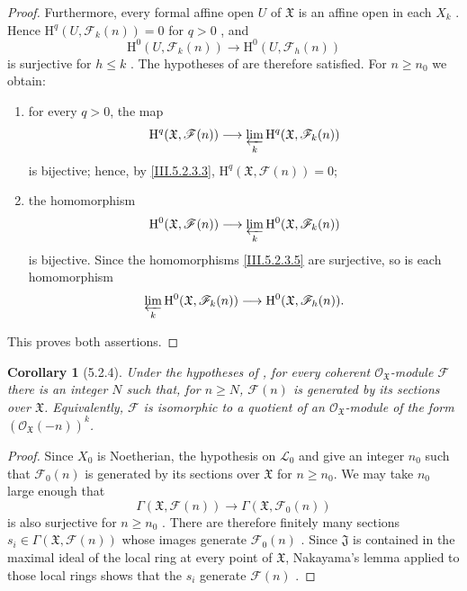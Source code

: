 \documentclass[oneside]{amsart}
\theoremstyle{ega-env-style}
\theoremstyle{ega-thm-env-style}
\newtheorem*{corollary}{Corollary}
\theoremstyle{ega-defn-env-style}
\def\mathcal{\mathscr}
\def\sh{\mathcal}                   %
\def\leq{\leqslant}                 %
\def\geq{\geqslant}                 %
\def\HH{\mathrm{H}}                 %
\newcommand{\oldpage}[2][]{{\marginnote{\normalfont{\textbf{#1}~|~#2}}}\ignorespaces}
\let\EGAOriginalLabel\label
\renewcommand{\label}[1]{\phantomsection\EGAOriginalLabel{#1}}
\begin{document}
\begin{proof}
Furthermore, every formal affine open $U$ of $\mathfrak{X}$ is an
affine open in each $X_k$ .  Hence
$\HH^q(U,\sh{F}_k(n))=0$ for $q>0$ , and
\[
  \HH^0(U,\sh{F}_k(n))
  \longrightarrow
  \HH^0(U,\sh{F}_h(n))
\]
is surjective for $h\leq k$ .  The hypotheses of
 are therefore satisfied.  For $n\geq n_0$ we
obtain:
\begin{enumerate}
  \item[$1^\circ$] for every $q>0$, the map
    \[
      \HH^q(\mathfrak{X},\sh{F}(n))
      \longrightarrow
      \varprojlim_k
      \HH^q(\mathfrak{X},\sh{F}_k(n))
    \]
    is bijective; hence, by \eqref{III.5.2.3.3},
    $\HH^q(\mathfrak{X},\sh{F}(n))=0$;
  \item[$2^\circ$] the homomorphism
    \[
      \HH^0(\mathfrak{X},\sh{F}(n))
      \longrightarrow
      \varprojlim_k
      \HH^0(\mathfrak{X},\sh{F}_k(n))
    \]
    is bijective.  Since the homomorphisms
    \eqref{III.5.2.3.5} are surjective, so is each homomorphism
    \[
      \varprojlim_k
      \HH^0(\mathfrak{X},\sh{F}_k(n))
      \longrightarrow
      \HH^0(\mathfrak{X},\sh{F}_h(n)).
    \]
\end{enumerate}
This proves both assertions.
\end{proof}

\begin{corollary}[5.2.4]
\label{III.5.2.4}
Under the hypotheses of , for every coherent
$\sh{O}_{\mathfrak{X}}$-module $\sh{F}$ there is an integer $N$
such that, for $n\geq N$, $\sh{F}(n)$ is generated by its sections
over
\oldpage[III]{153}
$\mathfrak{X}$.  Equivalently, $\sh{F}$ is isomorphic to a quotient
of an $\sh{O}_{\mathfrak{X}}$-module of the form
$(\sh{O}_{\mathfrak{X}}(-n))^k$.
\end{corollary}

\begin{proof}
Since $X_0$ is Noetherian, the hypothesis on $\sh{L}_0$ and
 give an integer $n_0$ such that
$\sh{F}_0(n)$ is generated by its sections over $\mathfrak{X}$ for
$n\geq n_0$.  We may take $n_0$ large enough that
\[
  \Gamma(\mathfrak{X},\sh{F}(n))
  \longrightarrow
  \Gamma(\mathfrak{X},\sh{F}_0(n))
\]
is also surjective for $n\geq n_0$ .  There are
therefore finitely many sections
$s_i\in\Gamma(\mathfrak{X},\sh{F}(n))$ whose images generate
$\sh{F}_0(n)$ .  Since $\mathfrak{J}$ is
contained in the maximal ideal of the local ring at every point
of $\mathfrak{X}$, Nakayama's lemma applied to those local rings
shows that the $s_i$ generate $\sh{F}(n)$
.
\end{proof}
\end{document}
